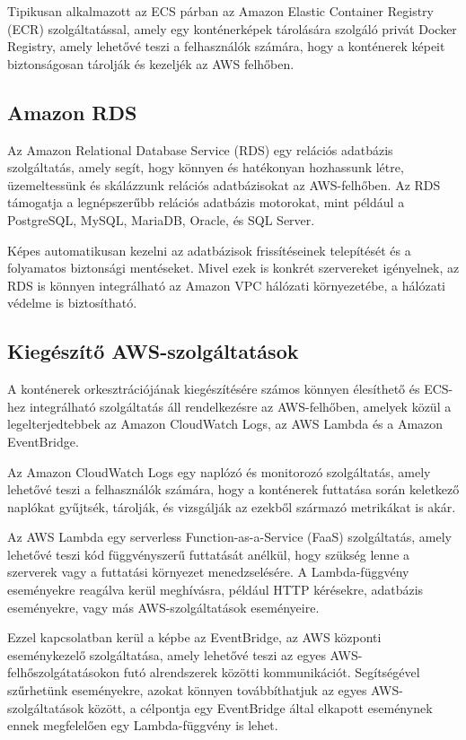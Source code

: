 Tipikusan alkalmazott az ECS párban az Amazon Elastic Container Registry (ECR) szolgáltatással, amely egy konténerképek tárolására szolgáló privát Docker Registry, amely lehetővé teszi a felhasználók számára, hogy a konténerek képeit biztonságosan tárolják és kezeljék az AWS felhőben.

\subsection{Amazon RDS}

Az Amazon Relational Database Service (RDS) egy relációs adatbázis szolgáltatás, amely segít, hogy könnyen és hatékonyan hozhassunk létre, üzemeltessünk és skálázzunk relációs adatbázisokat az AWS-felhőben. Az RDS támogatja a legnépszerűbb relációs adatbázis motorokat, mint például a PostgreSQL, MySQL, MariaDB, Oracle, és SQL Server.

Képes automatikusan kezelni az adatbázisok frissítéseinek telepítését és a folyamatos biztonsági mentéseket. Mivel ezek is konkrét szervereket igényelnek, az RDS is könnyen integrálható az Amazon VPC hálózati környezetébe, a hálózati védelme is biztosítható.

\subsection{Kiegészítő AWS-szolgáltatások}

A konténerek orkesztrációjának kiegészítésére számos könnyen élesíthető és ECS-hez integrálható szolgáltatás áll rendelkezésre az AWS-felhőben, amelyek közül a legelterjedtebbek az Amazon CloudWatch Logs, az AWS Lambda és a Amazon EventBridge.

Az Amazon CloudWatch Logs egy naplózó és monitorozó szolgáltatás, amely lehetővé teszi a felhasználók számára, hogy a konténerek futtatása során keletkező naplókat gyűjtsék, tárolják, és vizsgálják az ezekből származó metrikákat is akár.

Az AWS Lambda egy serverless Function-as-a-Service (FaaS) szolgáltatás, amely lehetővé teszi kód függvényszerű futtatását anélkül, hogy szükség lenne a szerverek vagy a futtatási környezet menedzselésére. A Lambda-függvény eseményekre reagálva kerül meghívásra, például HTTP kérésekre, adatbázis eseményekre, vagy más AWS-szolgáltatások eseményeire.

Ezzel kapcsolatban kerül a képbe az EventBridge, az AWS központi eseménykezelő szolgáltatása, amely lehetővé teszi az egyes AWS-felhőszolgátatásokon futó alrendszerek közötti kommunikációt. Segítségével szűrhetünk eseményekre, azokat könnyen továbbíthatjuk az egyes AWS-szolgáltatások között, a célpontja egy EventBridge által elkapott eseménynek ennek megfelelően egy Lambda-függvény is lehet.

